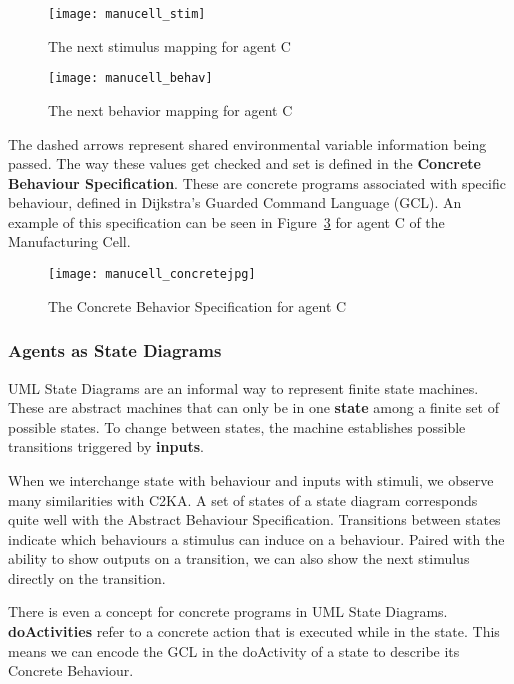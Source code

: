 \begin{figure}
    \centering
    \texttt{[image: manucell\_stim]}
    \caption{The next stimulus mapping for agent C~\cite{manu_cell}}
    \label{fig:manucell_stim}
\end{figure}
\begin{figure}
    \centering
    \texttt{[image: manucell\_behav]}
    \caption{The next behavior mapping for agent C~\cite{manu_cell}}
    \label{fig:manucell_behav}
\end{figure}

The dashed arrows represent shared environmental variable information being passed.
The way these values get checked and set is defined in the \textbf{Concrete Behaviour Specification}.
These are concrete programs associated with specific behaviour, defined in Dijkstra's Guarded Command Language (GCL).
An example of this specification can be seen in Figure~\ref{fig:manu_concrete} for agent C of the Manufacturing Cell.
\begin{figure}
    \centering
    \texttt{[image: manucell\_concretejpg]}
    \caption{The Concrete Behavior Specification for agent C~\cite{manu_cell}}
    \label{fig:manu_concrete}
\end{figure}

\subsubsection{Agents as State Diagrams}\label{subsubsec:diagram-agents}
UML State Diagrams are an informal way to represent finite state machines.
These are abstract machines that can only be in one \textbf{state} among a finite set of possible states.
To change between states, the machine establishes possible transitions triggered by \textbf{inputs}.

When we interchange state with behaviour and inputs with stimuli, we observe many similarities with C2KA\@.
A set of states of a state diagram corresponds quite well with the Abstract Behaviour Specification.
Transitions between states indicate which behaviours a stimulus can induce on a behaviour.
Paired with the ability to show outputs on a transition, we can also show the next stimulus directly on the transition.

There is even a concept for concrete programs in UML State Diagrams.
\textbf{doActivities} refer to a concrete action that is executed while in the state.
This means we can encode the GCL in the doActivity of a state to describe its Concrete Behaviour.

